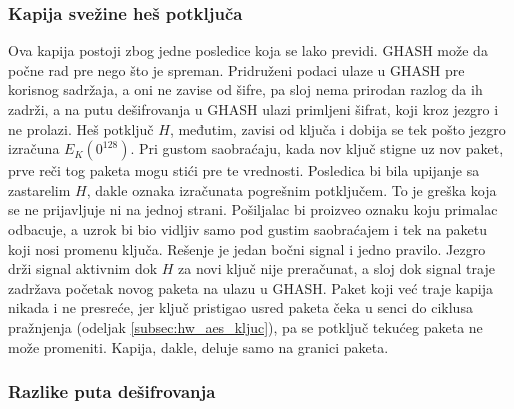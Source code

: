 \subsubsection{Kapija svežine heš potključa}
\label{subsec:hw_gcm_kapija}

Ova kapija postoji zbog jedne posledice koja se lako previdi. GHASH može da počne rad pre nego što je spreman. Pridruženi podaci ulaze u GHASH pre korisnog sadržaja, a oni ne zavise od šifre, pa sloj nema prirodan razlog da ih zadrži, a na putu dešifrovanja u GHASH ulazi primljeni šifrat, koji kroz jezgro i ne prolazi. Heš potključ $H$, međutim, zavisi od ključa i dobija se tek pošto jezgro izračuna $E_K(0^{128})$. Pri gustom saobraćaju, kada nov ključ stigne uz nov paket, prve reči tog paketa mogu stići pre te vrednosti.
\smallbreak
Posledica bi bila upijanje sa zastarelim $H$, dakle oznaka izračunata pogrešnim potključem. To je greška koja se ne prijavljuje ni na jednoj strani. Pošiljalac bi proizveo oznaku koju primalac odbacuje, a uzrok bi bio vidljiv samo pod gustim saobraćajem i tek na paketu koji nosi promenu ključa.
\smallbreak
Rešenje je jedan bočni signal i jedno pravilo. Jezgro drži signal aktivnim dok $H$ za novi ključ nije preračunat, a sloj dok signal traje zadržava početak novog paketa na ulazu u GHASH. Paket koji već traje kapija nikada i ne presreće, jer ključ pristigao usred paketa čeka u senci do ciklusa pražnjenja (odeljak \ref{subsec:hw_aes_kljuc}), pa se potključ tekućeg paketa ne može promeniti. Kapija, dakle, deluje samo na granici paketa.

\subsubsection{Razlike puta dešifrovanja}

